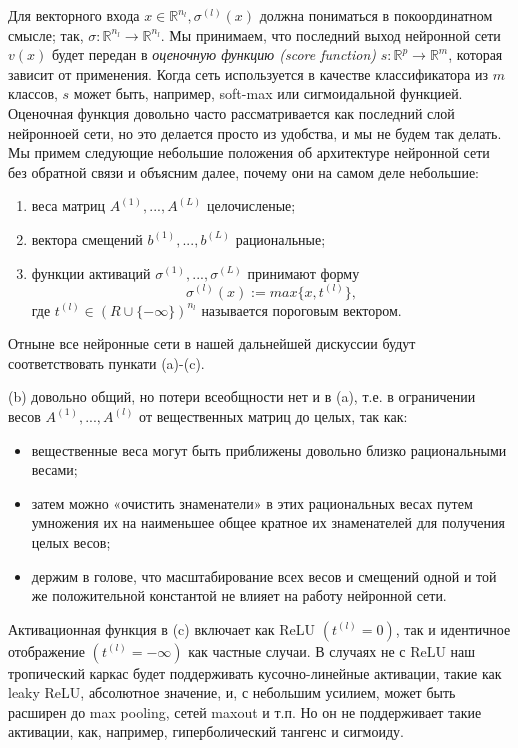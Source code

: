 \documentclass[russian]{lecture-notes}
\begin{document}
	Для векторного входа $x \in \mathbb{R}^{n_l}, \sigma^{(l)}(x)$ должна пониматься в покоординатном смысле; так, $\sigma : \mathbb{R}^{n_l} \to \mathbb{R}^{n_l}$. Мы принимаем, что последний выход нейронной сети $v(x)$ будет передан в \textit{оценочную функцию (score function)} $s : \mathbb{R}^p \to \mathbb{R}^m$, которая зависит от применения. Когда сеть используется в качестве классификатора из $m$ классов, $s$ может быть, например, soft-max или сигмоидальной функцией. Оценочная функция довольно часто рассматривается как последний слой нейронноей сети, но это делается просто из удобства, и мы не будем так делать. Мы примем следующие небольшие положения об архитектуре нейронной сети без обратной связи и объясним далее, почему они на самом деле небольшие:
	
	\begin{enumerate}[label=(\alph*)]
		\item веса матриц $A^{(1)},...,A^{(L)}$ целочисленые;
		\item вектора смещений $b^{(1)},...,b^{(L)}$ рациональные;
		\item функции активаций $\sigma^{(1)},...,\sigma^{(L)}$ принимают форму 
		\begin{equation*}
		\sigma^{(l)}(x) := max\{x,t^{(l)}\},
		\end{equation*}
		где $t^{(l)} \in (R \cup \{- \infty \})^{n_l}$ называется пороговым вектором.
	\end{enumerate}

	Отныне все нейронные сети в нашей дальнейшей дискуссии будут соответствовать пункати (a)-(c).
	
	(b) довольно общий, но потери всеобщности нет и в (a), т.е. в ограничении весов $A^{(1)},...,A^{(l)}$ от вещественных матриц до целых, так как:
	\begin{itemize}
		\item вещественные веса могут быть приближены довольно близко рациональными весами;
		\item затем можно «очистить знаменатели» в этих рациональных весах путем умножения их на наименьшее общее кратное их знаменателей для получения целых весов;
		\item держим в голове, что масштабирование всех весов и смещений одной и той же положительной константой не влияет на работу нейронной сети. 
	\end{itemize}

	Активационная функция в (c) включает как ReLU $(t^{(l)} = 0)$, так и идентичное отображение $(t^{(l)} = - \infty)$ как частные случаи. В случаях не с ReLU наш тропический каркас будет поддерживать кусочно-линейные активации, такие как leaky ReLU, абсолютное значение, и, с небольшим усилием, может быть расширен до max pooling, сетей maxout и т.п. Но он не поддерживает такие активации, как, например, гиперболический тангенс и сигмоиду.
	
\end{document}

